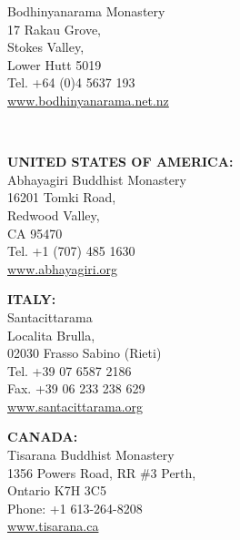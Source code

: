 {\begin{minipage}{0.95\linewidth}
\begin{multicols}{2}
{Bodhinyanarama Monastery\\
17 Rakau Grove,\\
Stokes Valley,\\
Lower Hutt 5019\\
Tel. +64 (0)4 5637 193\\
\href{http://www.bodhinyanarama.net.nz}{www.bodhinyanarama.net.nz}

}

\end{multicols}
\end{minipage}

\clearpage
\thispagestyle{empty}

{\chapterTitleSize\mbox{}}

\mbox{}

\mbox{} \\
\mbox{}
\vspace*{\baselineskip}

\begin{minipage}{0.95\linewidth}
\begin{multicols}{2}
\setlength{\parindent}{0pt}
\setlength{\parskip}{1.2em}
\addressesSize

{\raggedright

\textbf{UNITED STATES OF AMERICA:} \\
Abhayagiri Buddhist Monastery\\
16201 Tomki Road,\\
Redwood Valley,\\
CA 95470\\
Tel. +1 (707) 485 1630\\
\href{http://www.abhayagiri.org}{www.abhayagiri.org}

\textbf{ITALY:} \\
Santacittarama\\
Localita Brulla,\\
02030 Frasso Sabino (Rieti)\\
Tel. +39 07 6587 2186\\
Fax. +39 06 233 238 629\\
\href{http://www.santacittarama.org}{www.santacittarama.org}

}

\columnbreak

{\raggedright

\textbf{CANADA:} \\
Tisarana Buddhist Monastery\\
1356 Powers Road, RR \#3 Perth,\\
Ontario K7H 3C5\\
Phone: +1 613-264-8208\\
\href{http://www.tisarana.ca}{www.tisarana.ca}

}
\end{multicols}
\end{minipage}}
